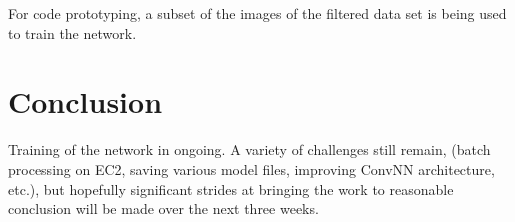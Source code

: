 \documentclass[letterpaper,12pt]{article}
\begin{document}
For code prototyping, a subset of the images of the filtered data set is being used to train the network.

\section{Conclusion}

Training of the network in ongoing. A variety of challenges still remain, (batch processing on EC2, saving various model files, improving ConvNN architecture, etc.), but hopefully significant strides at bringing the work to reasonable conclusion will be made over the next three weeks. 

\newpage


\end{document}
